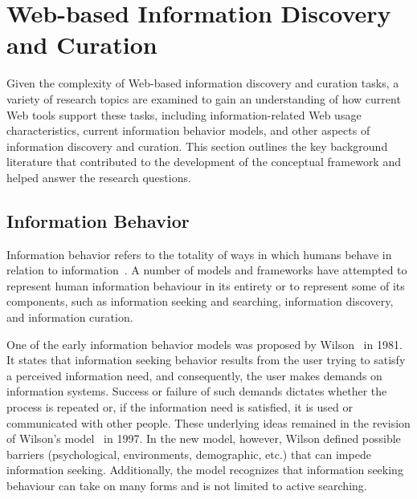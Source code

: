 \documentclass{sigchi}
\begin{document}
\section{Web-based Information Discovery and Curation}
\label{section:literature_review}
Given the complexity of Web-based information discovery and curation tasks, a variety of research topics are examined to gain an understanding of how current Web tools support these tasks, including information-related Web usage characteristics, current information behavior models, and other aspects of information discovery and curation.  This section outlines the key background literature that contributed to the development of the conceptual framework and helped answer the research questions. 

\subsection{Information Behavior}
Information behavior refers to the totality of ways in which humans behave in relation to information~\cite{wilson2000human}.  A number of models and frameworks have attempted to represent human information behaviour in its entirety or to represent some of its components, such as information seeking and searching, information discovery, and information curation. 

One of the early information behavior models was proposed by Wilson~\cite{wilson1981user} in 1981. It states that information seeking behavior results from the user trying to satisfy a perceived information need, and consequently, the user makes demands on information systems. Success or failure of such demands dictates whether the process is repeated or, if the information need is satisfied, it is used or communicated with other people. These underlying ideas remained in the revision of Wilson's model~\cite{wilson1997information} in 1997. In the new model, however, Wilson defined possible barriers (psychological, environments, demographic, etc.) that can impede information seeking. Additionally, the model recognizes that information seeking behaviour can take on many forms and is not limited to active searching. 
\end{document}
